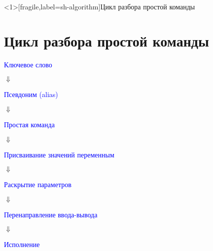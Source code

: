 % 
\begin{frame}<1>[fragile,label=sh-algorithm]{Цикл разбора простой команды}
\section{Цикл разбора простой команды}
\par\vspace{-1em}

\centering \large

\textcolor<2->{blue}{Ключевое слово}

$\Downarrow$

\textcolor<3->{blue}{Псевдоним (alias)}

$\Downarrow$

\textcolor<4->{blue}{Простая команда}

$\Downarrow$

\textcolor<5->{blue}{Присваивание значений переменным}

$\Downarrow$

\textcolor<7->{blue}{Раскрытие параметров}

$\Downarrow$

\textcolor<6->{blue}{Перенаправление ввода-вывода}

$\Downarrow$

\textcolor<8->{blue}{Исполнение}

\end{frame}
